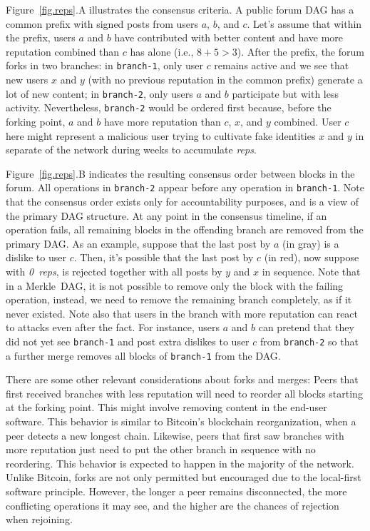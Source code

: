 \documentclass[12pt]{article}
\newcommand{\reps}     {\emph{reps}\xspace}
\newcommand{\nreps}[1] {\emph{#1~reps\xspace}}
\newcommand{\code}[1]  {\texttt{\footnotesize{#1}}}
\begin{document}
Figure~\ref{fig.reps}.A illustrates the consensus criteria.
A public forum DAG has a common prefix with signed posts from users $a$, $b$,
and $c$.
Let's assume that within the prefix, users $a$ and $b$ have contributed with
better content and have more reputation combined than $c$ has alone (i.e.,
$8+5>3$).
%
After the prefix, the forum forks in two branches:
in \code{branch-1}, only user $c$ remains active and we see that new users $x$
and $y$ (with no previous reputation in the common prefix) generate a lot of
new content;
in \code{branch-2}, only users $a$ and $b$ participate but with less activity.
Nevertheless, \code{branch-2} would be ordered first because, before the
forking point, $a$ and $b$ have more reputation than $c$, $x$, and $y$
combined.
%
User $c$ here might represent a malicious user trying to cultivate fake
identities $x$ and $y$ in separate of the network during weeks to accumulate
\reps.

Figure~\ref{fig.reps}.B indicates the resulting consensus order between blocks
in the forum.
All operations in \code{branch-2} appear before any operation in
\code{branch-1}.
Note that the consensus order exists only for accountability purposes, and is
a view of the primary DAG structure.
At any point in the consensus timeline, if an operation fails, all remaining
blocks in the offending branch are removed from the primary DAG.
As an example, suppose that the last post by $a$ (in gray) is a dislike to user
$c$.
Then, it's possible that the last post by $c$ (in red), now suppose with
\nreps{0}, is rejected together with all posts by $y$ and $x$ in sequence.
%
Note that in a Merkle~DAG, it is not possible to remove only the block with the
failing operation, instead, we need to remove the remaining branch completely,
as if it never existed.
%
Note also that users in the branch with more reputation can react to attacks
even after the fact.
For instance, users $a$ and $b$ can pretend that they did not yet see
\code{branch-1} and post extra dislikes to user $c$ from \code{branch-2} so
that a further merge removes all blocks of \code{branch-1} from the DAG.

There are some other relevant considerations about forks and merges:
%
Peers that first received branches with less reputation will need to reorder
all blocks starting at the forking point.
This might involve removing content in the end-user software.
This behavior is similar to Bitcoin's blockchain reorganization, when a peer
detects a new longest chain. %
%
Likewise, peers that first saw branches with more reputation just need to put
the other branch in sequence with no reordering.
This behavior is expected to happen in the majority of the network.
%
Unlike Bitcoin, forks are not only permitted but encouraged due to the
local-first software principle.
However, the longer a peer remains disconnected, the more conflicting
operations it may see, and the higher are the chances of rejection when
rejoining.
\end{document}

